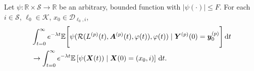 \begin{cor}\label{cor: lk}
	Let \(\psi: \mathbb R\times \mathcal S \to \mathbb R\) be an arbitrary, bounded function with \(|\psi(\cdot)|\leq F\). %
	For each \(i\in\mathcal S\), \(\ell_0\in\mathcal K\), \(x_0\in\mathcal D_{\ell_0,i}\),
	\begin{align}
		&\int_{t=0}^\infty e^{-\lambda t}\mathbb E\Bigg[\psi(\mathcal R(L^{(p)}(t),\boldsymbol A^{(p)}(t),\varphi(t)),\varphi(t) )  \mid \nonumber
		\boldsymbol Y^{(p)}(0)=\boldsymbol y_0^{(p)} \Bigg] \, \mathrm{d} t \nonumber
		\\&\to \int_{t=0}^\infty e^{-\lambda t}  \mathbb E\left[\psi({\boldsymbol X}(t))\mid \boldsymbol X(0)=(x_0, i) \right] \, \mathrm{d} t.\nonumber
	\end{align}
\end{cor}

